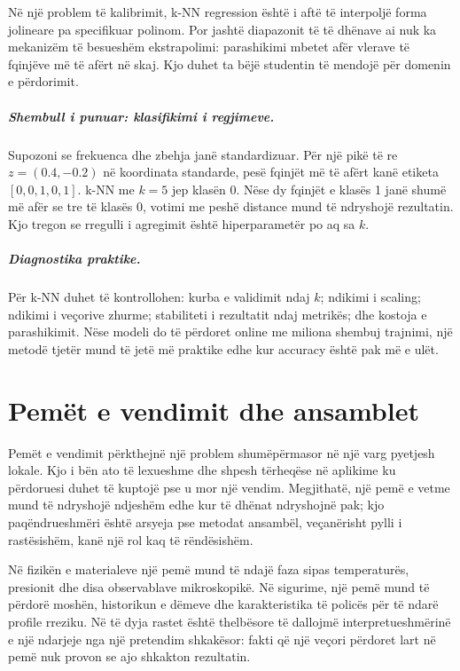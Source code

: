 \documentclass[12pt,a4paper,oneside]{book}
\begin{document}
Në një problem të kalibrimit, k-NN regression është i aftë të interpoljë forma jolineare pa specifikuar polinom. Por jashtë diapazonit të të dhënave ai nuk ka mekanizëm të besueshëm ekstrapolimi: parashikimi mbetet afër vlerave të fqinjëve më të afërt në skaj. Kjo duhet ta bëjë studentin të mendojë për domenin e përdorimit.

\paragraph{Shembull i punuar: klasifikimi i regjimeve.}
Supozoni se frekuenca dhe zbehja janë standardizuar. Për një pikë të re $z=(0.4,-0.2)$ në koordinata standarde, pesë fqinjët më të afërt kanë etiketa $[0,0,1,0,1]$. k-NN me $k=5$ jep klasën 0. Nëse dy fqinjët e klasës 1 janë shumë më afër se tre të klasës 0, votimi me peshë distance mund të ndryshojë rezultatin. Kjo tregon se rregulli i agregimit është hiperparametër po aq sa $k$.

\paragraph{Diagnostika praktike.}
Për k-NN duhet të kontrollohen: kurba e validimit ndaj $k$; ndikimi i scaling; ndikimi i veçorive zhurme; stabiliteti i rezultatit ndaj metrikës; dhe kostoja e parashikimit. Nëse modeli do të përdoret online me miliona shembuj trajnimi, një metodë tjetër mund të jetë më praktike edhe kur accuracy është pak më e ulët.

\chapter[Pemët dhe ansamblet]{Pemët e vendimit dhe ansamblet}

Pemët e vendimit përkthejnë një problem shumëpërmasor në një varg pyetjesh lokale. Kjo i bën ato të lexueshme dhe shpesh tërheqëse në aplikime ku përdoruesi duhet të kuptojë pse u mor një vendim. Megjithatë, një pemë e vetme mund të ndryshojë ndjeshëm edhe kur të dhënat ndryshojnë pak; kjo paqëndrueshmëri është arsyeja pse metodat ansambël, veçanërisht pylli i rastësishëm, kanë një rol kaq të rëndësishëm.

Në fizikën e materialeve një pemë mund të ndajë faza sipas temperaturës, presionit dhe disa observablave mikroskopikë. Në sigurime, një pemë mund të përdorë moshën, historikun e dëmeve dhe karakteristika të policës për të ndarë profile rreziku. Në të dyja rastet është thelbësore të dallojmë interpretueshmërinë e një ndarjeje nga një pretendim shkakësor: fakti që një veçori përdoret lart në pemë nuk provon se ajo shkakton rezultatin.
\end{document}

